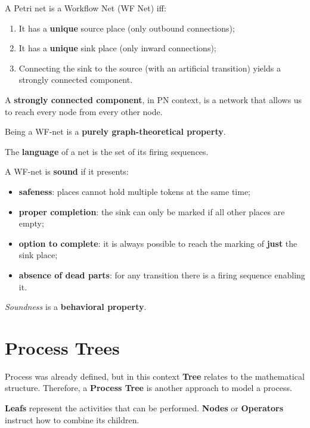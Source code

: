 A Petri net is a Workflow Net (WF Net) iff:

\begin{enumerate}
	\item It has a \textbf{unique} source place (only outbound connections);
	\item It has a \textbf{unique} sink place (only inward connections);
	\item Connecting the sink to the source (with an artificial transition) yields a strongly connected component.
\end{enumerate}

\begin{remark}
	A \textbf{strongly connected component}, in PN context, is a network that allows us to reach every node from every other node.
\end{remark}

Being a WF-net is a \textbf{purely graph-theoretical property}.

\begin{remark}
	The \textbf{language} of a net is the set of its firing sequences.
\end{remark}

A WF-net is \textbf{sound} if it presents:
\begin{itemize}
	\item \textbf{safeness}: places cannot hold multiple tokens at the same time;
	\item \textbf{proper completion}: the sink can only be marked if all other places are empty;
	\item \textbf{option to complete}: it is always possible to reach the marking of \textbf{just} the sink place;
	\item \textbf{absence of dead parts}: for any transition there is a firing sequence enabling it.
\end{itemize}

\begin{remark}
	\emph{Soundness} is a \textbf{behavioral property}.
\end{remark}

\section*{Process Trees}

Process was already defined, but in this context \textbf{Tree} relates to the mathematical structure. Therefore, a \textbf{Process Tree} is another approach to model a process.

\textbf{Leafs} represent the activities that can be performed. \textbf{Nodes} or \textbf{Operators} instruct how to combine its children.

